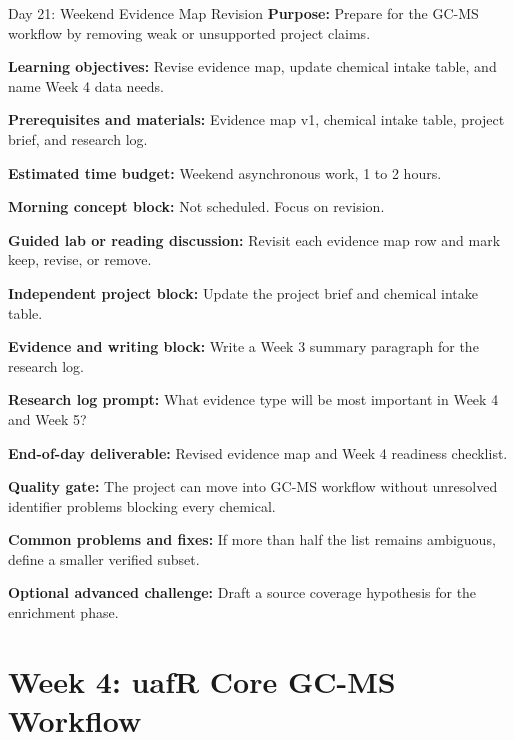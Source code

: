 \begin{dailybox}{Day 21: Weekend Evidence Map Revision}
\textbf{Purpose:} Prepare for the GC-MS workflow by removing weak or unsupported project claims.

\textbf{Learning objectives:} Revise evidence map, update chemical intake table, and name Week 4 data needs.

\textbf{Prerequisites and materials:} Evidence map v1, chemical intake table, project brief, and research log.

\textbf{Estimated time budget:} Weekend asynchronous work, 1 to 2 hours.

\textbf{Morning concept block:} Not scheduled. Focus on revision.

\textbf{Guided lab or reading discussion:} Revisit each evidence map row and mark keep, revise, or remove.

\textbf{Independent project block:} Update the project brief and chemical intake table.

\textbf{Evidence and writing block:} Write a Week 3 summary paragraph for the research log.

\textbf{Research log prompt:} What evidence type will be most important in Week 4 and Week 5?

\textbf{End-of-day deliverable:} Revised evidence map and Week 4 readiness checklist.

\textbf{Quality gate:} The project can move into GC-MS workflow without unresolved identifier problems blocking every chemical.

\textbf{Common problems and fixes:} If more than half the list remains ambiguous, define a smaller verified subset.

\textbf{Optional advanced challenge:} Draft a source coverage hypothesis for the enrichment phase.
\end{dailybox}

\section{Week 4: uafR Core GC-MS Workflow}


